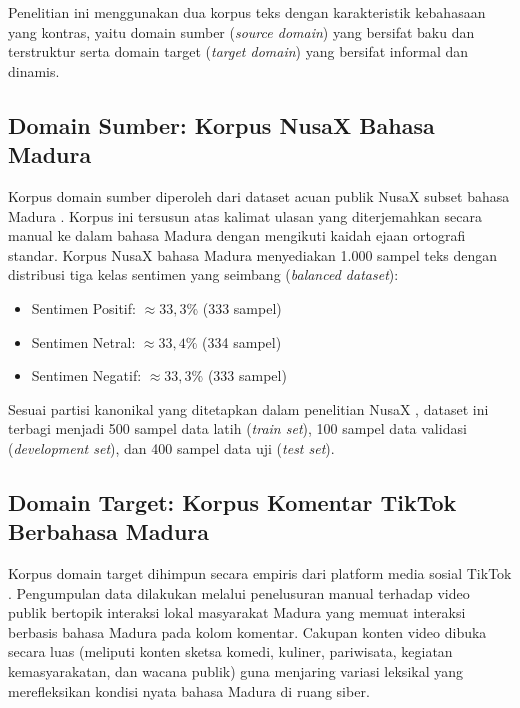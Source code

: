 Penelitian ini menggunakan dua korpus teks dengan karakteristik kebahasaan yang kontras, yaitu domain sumber (\textit{source domain}) yang bersifat baku dan terstruktur serta domain target (\textit{target domain}) yang bersifat informal dan dinamis.

\subsection{Domain Sumber: Korpus NusaX Bahasa Madura}

Korpus domain sumber diperoleh dari dataset acuan publik NusaX subset bahasa Madura \citep{winata2023nusax}. Korpus ini tersusun atas kalimat ulasan yang diterjemahkan secara manual ke dalam bahasa Madura dengan mengikuti kaidah ejaan ortografi standar. Korpus NusaX bahasa Madura menyediakan 1.000 sampel teks dengan distribusi tiga kelas sentimen yang seimbang (\textit{balanced dataset}):
\begin{itemize}
    \item Sentimen Positif: $\approx 33{,}3\%$ (333 sampel)
    \item Sentimen Netral: $\approx 33{,}4\%$ (334 sampel)
    \item Sentimen Negatif: $\approx 33{,}3\%$ (333 sampel)
\end{itemize}

Sesuai partisi kanonikal yang ditetapkan dalam penelitian NusaX \citep{winata2023nusax}, dataset ini terbagi menjadi 500 sampel data latih (\textit{train set}), 100 sampel data validasi (\textit{development set}), dan 400 sampel data uji (\textit{test set}).

\subsection{Domain Target: Korpus Komentar TikTok Berbahasa Madura}

Korpus domain target dihimpun secara empiris dari platform media sosial TikTok \citep{luther2026analisis, saputra2026reaksi}. Pengumpulan data dilakukan melalui penelusuran manual terhadap video publik bertopik interaksi lokal masyarakat Madura yang memuat interaksi berbasis bahasa Madura pada kolom komentar. Cakupan konten video dibuka secara luas (meliputi konten sketsa komedi, kuliner, pariwisata, kegiatan kemasyarakatan, dan wacana publik) guna menjaring variasi leksikal yang merefleksikan kondisi nyata bahasa Madura di ruang siber.

